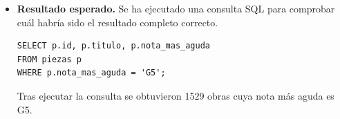 \begin{itemize}
*   **IE-2019-D-HLS-001** (Compás: 4/4, Tonalidad: G major)
*   **IE-2019-D-HLS-003** (Compás: 4/4, Tonalidad: G major, BPM: 140)
*   **IE-2019-D-HLS-004** (Compás: 6/8, Tonalidad: G major)
*   **IE-2019-D-HLS-008** (Compás: 3/4, Tonalidad: G major)
*   **IE-2019-D-HLS-012** (Compás: 3/2, Tonalidad: G minor, BPM: 60)
*   **IE-2019-D-HLS-024** (Compás: 4/4, Tonalidad: G major)
*   **IE-2019-D-HLS-026** (Compás: 4/4, Tonalidad: G major, BPM: 96)
*   **IE-2019-D-HLS-027** (Compás: 3/4, Tonalidad: E minor, BPM: 144)
*   **IE-2019-D-HLS-031** (Compás: 4/4, Tonalidad: G major, BPM: 115)
*   **IE-2019-D-HLS-033** (Compás: 4/4, Tonalidad: G major, BPM: 70)"
    \item \textbf{Resultado esperado.} Se ha ejecutado una consulta SQL para comprobar cuál habría sido el resultado completo correcto.
    \begin{verbatim}
SELECT p.id, p.titulo, p.nota_mas_aguda
FROM piezas p
WHERE p.nota_mas_aguda = 'G5';
    \end{verbatim}    
    Tras ejecutar la consulta se obtuvieron 1529 obras cuya nota más aguda es G5.

\end{itemize}

